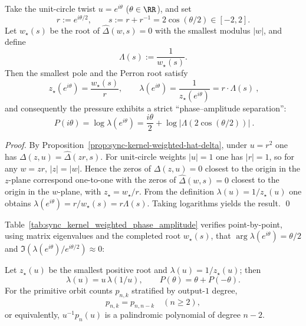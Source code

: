 \begin{corollary}[Phase--amplitude separation on the unit-circle twist: \texorpdfstring{$P(i\theta)=\frac{i\theta}{2}+\log|\Lambda(s)|$}{P(i theta)=i theta/2 + log|Lambda(s)|}]\label{cor:sync-kernel-weighted-phase-amplitude}
Take the unit-circle twist \(u=e^{i\theta}\) (\(\theta\in\RR\)), and set
\[
r:=e^{i\theta/2},\qquad s:=r+r^{-1}=2\cos(\theta/2)\in[-2,2].
\]
Let \(w_\star(s)\) be the root of \(\widehat\Delta(w,s)=0\) with the smallest modulus \(|w|\), and define
\[
\Lambda(s):=\frac{1}{w_\star(s)}.
\]
Then the smallest pole and the Perron root satisfy
\[
\boxed{\ z_\star(e^{i\theta})=\frac{w_\star(s)}{r},\qquad \lambda(e^{i\theta})=\frac{1}{z_\star(e^{i\theta})}=r\cdot \Lambda(s)\ },
\]
and consequently the pressure exhibits a strict ``phase--amplitude separation'':
\[
\boxed{\ P(i\theta)=\log\lambda(e^{i\theta})=\frac{i\theta}{2}+\log|\Lambda(2\cos(\theta/2))|\ }.
\]
\end{corollary}
\begin{proof}
By Proposition~\ref{prop:sync-kernel-weighted-hat-delta}, under \(u=r^2\) one has
\(
\Delta(z,u)=\widehat\Delta(zr,s)
\).
For unit-circle weights \(|u|=1\) one has \(|r|=1\), so for any \(w=zr\), \(|z|=|w|\).
Hence the zeros of \(\Delta(z,u)=0\) closest to the origin in the \(z\)-plane correspond one-to-one with the zeros of \(\widehat\Delta(w,s)=0\) closest to the origin in the \(w\)-plane, with \(z_\star=w_\star/r\).
From the definition \(\lambda(u)=1/z_\star(u)\) one obtains \(\lambda(e^{i\theta})=r/w_\star(s)=r\Lambda(s)\). Taking logarithms yields the result. \qed
\end{proof}

\begin{remark}\label{rem:sync-kernel-weighted-phase-amplitude-table}
Table~\ref{tab:sync_kernel_weighted_phase_amplitude} verifies point-by-point, using matrix eigenvalues and the completed root \(w_\star(s)\), that
\(\arg\lambda(e^{i\theta})=\theta/2\) and \(\Im(\lambda(e^{i\theta})/e^{i\theta/2})\approx 0\):

\end{remark}
Let $z_\star(u)$ be the smallest positive root and $\lambda(u)=1/z_\star(u)$; then
\[
\lambda(u)=u\,\lambda(1/u),
\qquad
P(\theta)=\theta+P(-\theta).
\]
For the primitive orbit counts $p_{n,k}$ stratified by output-$1$ degree,
\[
p_{n,k}=p_{n,n-k}\quad(n\ge 2),
\]
or equivalently, $u^{-1}p_n(u)$ is a palindromic polynomial of degree $n-2$.

